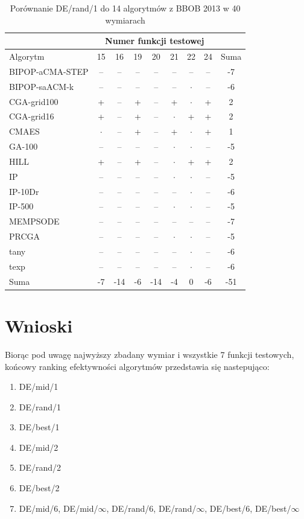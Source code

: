 \documentclass[a4paper,onecolumn,oneside,12pt,wide,floatssmall]{mwrep}
\theoremstyle{definition}
\theoremstyle{plain}%
\theoremstyle{remark}
\begin{document}
\begin{table}[H]
\centering
\begin{tabular}{ l | c | c | c | c | c | c | c | c }
		 & \multicolumn{7}{c|}{Numer funkcji testowej}  \\  \hline
Algorytm         &15& 16& 19& 20& 21& 22& 24 & Suma \\  \hline
BIPOP-aCMA-STEP	 & -- & -- & -- & -- & -- & -- & -- & -7 \\
BIPOP-saACM-k	 & -- & -- & -- & -- & -- & $\cdot$ & -- & -6 \\
CGA-grid100	 & + & -- & + & -- & + & $\cdot$ & + & 2 \\
CGA-grid16	 & + & -- & + & -- & $\cdot$ & + & + & 2\\
CMAES	 & $\cdot$ & -- & + & -- & + & $\cdot$ & + & 1 \\
GA-100	 & -- & -- & -- & -- & $\cdot$ & $\cdot$ & -- & -5 \\
HILL	 & + & -- & + & -- & $\cdot$ & + & + & 2 \\
IP	 & -- & -- & -- & -- & $\cdot$ & $\cdot$ & -- & -5 \\
IP-10Dr	 & -- & -- & -- & -- & -- & $\cdot$ & -- & -6 \\
IP-500	 & -- & -- & -- & -- & $\cdot$ & $\cdot$ & -- & -5\\
MEMPSODE	 & -- & -- & -- & -- & -- & -- & -- & -7 \\
PRCGA	 & -- & -- & -- & -- & $\cdot$ & $\cdot$ & -- & -5\\
tany	 & -- & -- & -- & -- & -- & $\cdot$ & -- & -6 \\
texp	 & -- & -- & -- & -- & -- & $\cdot$ & -- & -6 \\ \hline
Suma     & -7 & -14 & -6 & -14 & -4 & 0 & -6 & -51
\end{tabular}
\caption{Porównanie DE/rand/1 do 14 algorytmów z BBOB 2013 w 40 wymiarach}
\end{table}

\section{Wnioski}

Biorąc pod uwagę najwyższy zbadany wymiar i wszystkie 7 funkcji testowych,
końcowy ranking efektywności algorytmów przedstawia się 
nastepująco:

\begin{enumerate}
 \item DE/mid/1
 \item DE/rand/1
 \item DE/best/1
 \item DE/mid/2
 \item DE/rand/2
 \item DE/best/2
 \item DE/mid/6, DE/mid/$\infty$, DE/rand/6, DE/rand/$\infty$, DE/best/6, DE/best/$\infty$
\end{enumerate}
\end{document}
